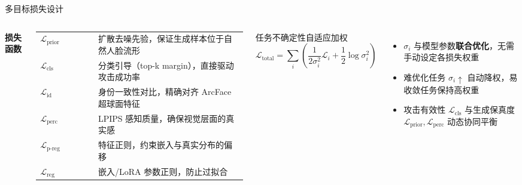 \documentclass[aspectratio=169,12pt]{beamer}
\renewcommand{\textbf}[1]{\textcolor{hitblue}{\bfseries #1}}
\begin{document}
\begin{frame}{多目标损失设计}
\footnotesize
\vspace{2pt}
\begin{columns}[T]
  \textbf{损失函数}\\[6pt]
  {\footnotesize\renewcommand{\arraystretch}{1.5}%
  \begin{tabular}{@{}lp{0.72\linewidth}@{}}
    $\mathcal{L}_{\text{prior}}$ & 扩散去噪先验，保证生成样本位于自然人脸流形 \\
    $\mathcal{L}_{\text{cls}}$ & 分类引导（top-k margin），直接驱动攻击成功率 \\
    $\mathcal{L}_{\text{id}}$ & 身份一致性对比，精确对齐 ArcFace 超球面特征 \\
    $\mathcal{L}_{\text{perc}}$ & LPIPS 感知质量，确保视觉层面的真实感 \\
    $\mathcal{L}_{\text{p-reg}}$ & 特征正则，约束嵌入与真实分布的偏移 \\
    $\mathcal{L}_{\text{reg}}$ & 嵌入/LoRA 参数正则，防止过拟合 \\
  \end{tabular}}

  \begin{block}{任务不确定性自适应加权}
  \footnotesize
  \[
  \mathcal{L}_{\text{total}}=\sum_i\!\left(\frac{1}{2\sigma_i^2}\mathcal{L}_i+\frac{1}{2}\log\sigma_i^2\right)
  \]
  \end{block}
  \vspace{6pt}
  \begin{itemize}\setlength{\itemsep}{4pt}
    \scriptsize
    \item $\sigma_i$ 与模型参数\textbf{联合优化}，无需手动设定各损失权重
    \item 难优化任务 $\sigma_i\!\uparrow$ 自动降权，易收敛任务保持高权重
    \item 攻击有效性 $\mathcal{L}_{\text{cls}}$ 与生成保真度 $\mathcal{L}_{\text{prior}},\mathcal{L}_{\text{perc}}$ 动态协同平衡
  \end{itemize}
\end{columns}
\end{frame} %
\end{document}
